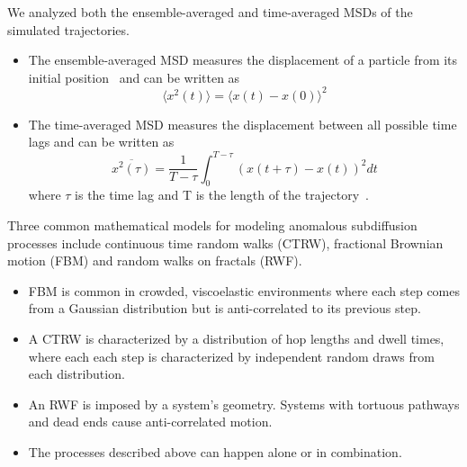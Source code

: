 \documentclass{article}
\begin{document}
  \noindent We analyzed both the ensemble-averaged and time-averaged MSDs
  of the simulated trajectories.
  \begin{itemize}
	\item The ensemble-averaged MSD measures the displacement of a particle from its initial
	position~\cite{meroz_toolbox_2015} and can be written as
	\begin{equation}
	\langle x^2(t) \rangle = \langle x(t) - x(0) \rangle^2
	\label{eqn:ensemble_msd}
	\end{equation}
	\item The time-averaged MSD measures the displacement between all possible time lags
	and can be written as
	\begin{equation}
	\overline{x^2(\tau)} = \dfrac{1}{T - \tau}\int_{0}^{T - \tau} (x(t + \tau) - x(t))^2 dt
	\end{equation}
	where $\tau$ is the time lag and T is the length of the
	trajectory~\cite{meroz_toolbox_2015}. 
  \end{itemize}
  
  \noindent Three common mathematical models for modeling anomalous subdiffusion
  processes include continuous time random walks (CTRW), fractional Brownian motion
  (FBM) and random walks on fractals (RWF).\cite{meroz_toolbox_2015}
  \begin{itemize}
    \item FBM is common in crowded, viscoelastic environments where each step comes 
    from a Gaussian distribution but is anti-correlated to its previous 
    step.~\cite{mandelbrot_fractional_1968,jeon_fractional_2010,banks_anomalous_2005}
    \item A CTRW is characterized by a distribution of hop lengths and 
    dwell times, where each each step is characterized by independent random draws from 
    each distribution.\cite{montroll_random_1965,morrin_three_2018}
    \item An RWF is imposed by a system's geometry. Systems with tortuous pathways and dead
    ends cause anti-correlated motion.\cite{meroz_toolbox_2015,neusius_subdiffusion_2008}
    \item The processes described above can happen alone or in combination.  	
  \end{itemize}
\end{document}
